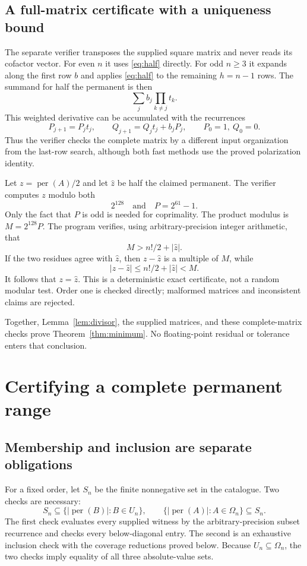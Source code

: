 \documentclass[11pt,a4paper]{article}
\theoremstyle{remark}\newtheorem{remark}[theorem]{Remark}
\DeclareMathOperator{\per}{per}
\newcommand{\Om}{\Omega}
\begin{document}
\subsection{A full-matrix certificate with a uniqueness bound}
The separate verifier transposes the supplied square matrix and never reads its cofactor vector. For even $n$ it uses \eqref{eq:half} directly. For odd $n\geq3$ it expands along the first row $b$ and applies \eqref{eq:half} to the remaining $h=n-1$ rows. The summand for half the permanent is then
\[
 \sum_j b_j\prod_{k\ne j}t_k.
\]
This weighted derivative can be accumulated with the recurrences
\[
 P_{j+1}=P_jt_j,\qquad Q_{j+1}=Q_jt_j+b_jP_j,
 \qquad P_0=1,\ Q_0=0.
\]
Thus the verifier checks the complete matrix by a different input organization from the last-row search, although both fast methods use the proved polarization identity.

Let $z=\per(A)/2$ and let $\widehat z$ be half the claimed permanent. The verifier computes $z$ modulo both
\[
 2^{128}\quad\text{and}\quad P=2^{61}-1.
\]
Only the fact that $P$ is odd is needed for coprimality. The product modulus is $M=2^{128}P$. The program verifies, using arbitrary-precision integer arithmetic, that
\begin{equation}\label{eq:crtbound}
 M>n!/2+|\widehat z|.
\end{equation}
If the two residues agree with $\widehat z$, then $z-\widehat z$ is a multiple of $M$, while
\[
 |z-\widehat z|\leq n!/2+|\widehat z|<M.
\]
It follows that $z=\widehat z$. This is a deterministic exact certificate, not a random modular test. Order one is checked directly; malformed matrices and inconsistent claims are rejected.

Together, Lemma~\ref{lem:divisor}, the supplied matrices, and these complete-matrix checks prove Theorem~\ref{thm:minimum}. No floating-point residual or tolerance enters that conclusion.

\section{Certifying a complete permanent range}
\subsection{Membership and inclusion are separate obligations}
For a fixed order, let $S_n$ be the finite nonnegative set in the catalogue. Two checks are necessary:
\[
 S_n\subseteq\{|\per(B)|:B\in U_n\},\qquad
 \{|\per(A)|:A\in\Om_n\}\subseteq S_n.
\]
The first check evaluates every supplied witness by the arbitrary-precision subset recurrence and checks every below-diagonal entry. The second is an exhaustive inclusion check with the coverage reductions proved below. Because $U_n\subseteq\Om_n$, the two checks imply equality of all three absolute-value sets.
\end{document}
